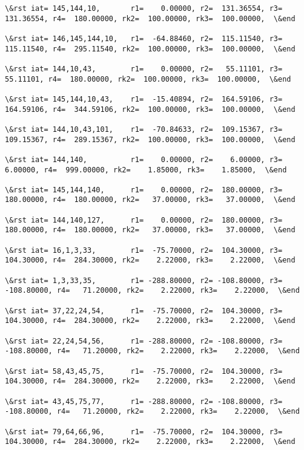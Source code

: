 \documentclass[11pt]{article}
\begin{document}
\begin{Verbatim}[commandchars=\\\{\}]
\&rst iat= 145,144,10,       r1=    0.00000, r2=  131.36554, r3=  131.36554, r4=  180.00000, rk2=  100.00000, rk3=  100.00000,  \&end

\&rst iat= 146,145,144,10,   r1=  -64.88460, r2=  115.11540, r3=  115.11540, r4=  295.11540, rk2=  100.00000, rk3=  100.00000,  \&end

\&rst iat= 144,10,43,        r1=    0.00000, r2=   55.11101, r3=   55.11101, r4=  180.00000, rk2=  100.00000, rk3=  100.00000,  \&end

\&rst iat= 145,144,10,43,    r1=  -15.40894, r2=  164.59106, r3=  164.59106, r4=  344.59106, rk2=  100.00000, rk3=  100.00000,  \&end

\&rst iat= 144,10,43,101,    r1=  -70.84633, r2=  109.15367, r3=  109.15367, r4=  289.15367, rk2=  100.00000, rk3=  100.00000,  \&end

\&rst iat= 144,140,          r1=    0.00000, r2=    6.00000, r3=    6.00000, r4=  999.00000, rk2=    1.85000, rk3=    1.85000,  \&end

\&rst iat= 145,144,140,      r1=    0.00000, r2=  180.00000, r3=  180.00000, r4=  180.00000, rk2=   37.00000, rk3=   37.00000,  \&end

\&rst iat= 144,140,127,      r1=    0.00000, r2=  180.00000, r3=  180.00000, r4=  180.00000, rk2=   37.00000, rk3=   37.00000,  \&end

\&rst iat= 16,1,3,33,        r1=  -75.70000, r2=  104.30000, r3=  104.30000, r4=  284.30000, rk2=    2.22000, rk3=    2.22000,  \&end

\&rst iat= 1,3,33,35,        r1= -288.80000, r2= -108.80000, r3= -108.80000, r4=   71.20000, rk2=    2.22000, rk3=    2.22000,  \&end

\&rst iat= 37,22,24,54,      r1=  -75.70000, r2=  104.30000, r3=  104.30000, r4=  284.30000, rk2=    2.22000, rk3=    2.22000,  \&end

\&rst iat= 22,24,54,56,      r1= -288.80000, r2= -108.80000, r3= -108.80000, r4=   71.20000, rk2=    2.22000, rk3=    2.22000,  \&end

\&rst iat= 58,43,45,75,      r1=  -75.70000, r2=  104.30000, r3=  104.30000, r4=  284.30000, rk2=    2.22000, rk3=    2.22000,  \&end

\&rst iat= 43,45,75,77,      r1= -288.80000, r2= -108.80000, r3= -108.80000, r4=   71.20000, rk2=    2.22000, rk3=    2.22000,  \&end

\&rst iat= 79,64,66,96,      r1=  -75.70000, r2=  104.30000, r3=  104.30000, r4=  284.30000, rk2=    2.22000, rk3=    2.22000,  \&end


\end{Verbatim}
\end{document}
